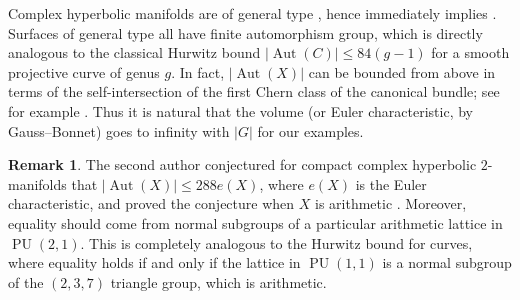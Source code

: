 \documentclass[11pt]{article}
\theoremstyle{plain}
\theoremstyle{definition}
\newtheorem{rem}[thm]{Remark}
\theoremstyle{remark}
\DeclareMathOperator{\PU}{PU}
\DeclareMathOperator{\Aut}{Aut}
\begin{document}
Complex hyperbolic manifolds are of general type \cite[\S V.20]{BPV}, hence  immediately implies . Surfaces of general type all have finite automorphism group, which is directly analogous to the classical Hurwitz bound $|\Aut(C)| \le 84(g-1)$ for a smooth projective curve of genus $g$. In fact, $|\Aut(X)|$ can be bounded from above in terms of the self-intersection of the first Chern class of the canonical bundle; see for example \cite{Xiao}. Thus it is natural that the volume (or Euler characteristic, by Gauss--Bonnet) goes to infinity with $|G|$ for our examples.

\begin{rem}\label{rem:Hurwitz}
The second author conjectured for compact complex hyperbolic $2$-manifolds that $|\Aut(X)| \le 288 e(X)$, where $e(X)$ is the Euler characteristic, and proved the conjecture when $X$ is arithmetic \cite{StoverHurwitz}. Moreover, equality should come from normal subgroups of a particular arithmetic lattice in $\PU(2,1)$. This is completely analogous to the Hurwitz bound for curves, where equality holds if and only if the lattice in $\PU(1,1)$ is a normal subgroup of the $(2,3,7)$ triangle group, which is arithmetic.
\end{rem}



\end{document}
